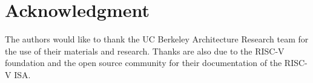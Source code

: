 \documentclass[journal]{IEEEtran}
\begin{document}

%


\section*{Acknowledgment}

The authors would like to thank the UC Berkeley Architecture Research team for the use of their materials and research. Thanks are also due to the RISC-V foundation and the open source community for their documentation of the RISC-V ISA.


\ifCLASSOPTIONcaptionsoff
  \newpage
\fi







%
 
\end{document}
